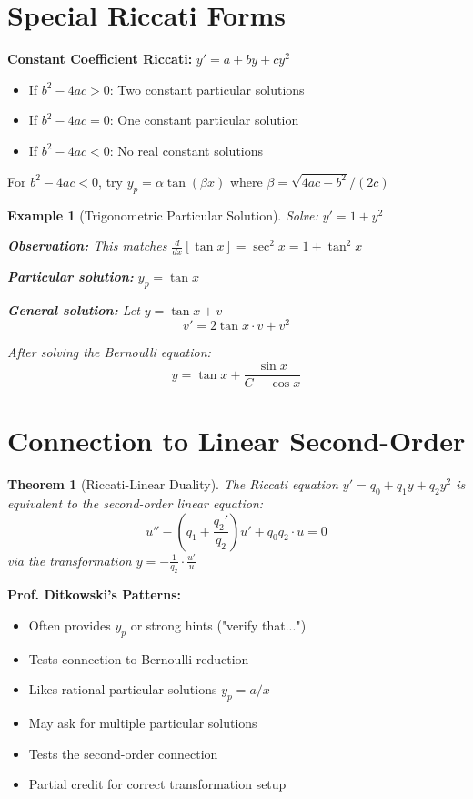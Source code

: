 \documentclass[12pt]{article}
\newtheorem{theorem}{Theorem}
\newtheorem{example}{Example}
\begin{document}
\section{Special Riccati Forms}

\begin{insight}
\textbf{Constant Coefficient Riccati:} $y' = a + by + cy^2$
\begin{itemize}
    \item If $b^2 - 4ac > 0$: Two constant particular solutions
    \item If $b^2 - 4ac = 0$: One constant particular solution
    \item If $b^2 - 4ac < 0$: No real constant solutions
\end{itemize}
For $b^2 - 4ac < 0$, try $y_p = \alpha \tan(\beta x)$ where $\beta = \sqrt{4ac - b^2}/(2c)$
\end{insight}

\begin{example}[Trigonometric Particular Solution]
Solve: $y' = 1 + y^2$

\textbf{Observation:} This matches $\frac{d}{dx}[\tan x] = \sec^2 x = 1 + \tan^2 x$

\textbf{Particular solution:} $y_p = \tan x$

\textbf{General solution:} Let $y = \tan x + v$
$$v' = 2\tan x \cdot v + v^2$$

After solving the Bernoulli equation:
$$y = \tan x + \frac{\sin x}{C - \cos x}$$
\end{example}

\section{Connection to Linear Second-Order}

\begin{theorem}[Riccati-Linear Duality]
The Riccati equation $y' = q_0 + q_1y + q_2y^2$ is equivalent to the second-order linear equation:
$$u'' - (q_1 + \frac{q_2'}{q_2})u' + q_0q_2 \cdot u = 0$$
via the transformation $y = -\frac{1}{q_2} \cdot \frac{u'}{u}$
\end{theorem}

\begin{examtip}
\textbf{Prof. Ditkowski's Patterns:}
\begin{itemize}
    \item Often provides $y_p$ or strong hints ("verify that...")
    \item Tests connection to Bernoulli reduction
    \item Likes rational particular solutions $y_p = a/x$
    \item May ask for multiple particular solutions
    \item Tests the second-order connection
    \item Partial credit for correct transformation setup
\end{itemize}
\end{examtip}
\end{document}
